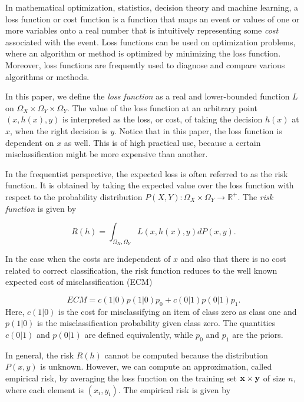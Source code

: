 In mathematical optimization, statistics, decision theory and machine learning, a loss function or cost function is a function that maps an event or values of one or more variables onto a real number that is intuitively representing some \emph{cost} associated with the event. Loss functions can be used on optimization problems, where an algorithm or method is optimized by minimizing the loss function.  Moreover, loss functions are frequently used to diagnose and compare various algorithms or methods.  

In this paper, we define the \emph{loss function} as a real and lower-bounded function $L$ on $\Omega_X \times \Omega_Y \times \Omega_Y$.  The value of the loss function at an arbitrary point $(x, h(x), y)$ is interpreted as the loss, or cost, of taking the decision $h(x)$ at $x$, when the right decision is $y$.  Notice that in this paper, the loss function is dependent on $x$ as well.  This is of high practical use, because a certain misclassification might be more expensive than another. 

In the frequentist perspective, the expected loss is often referred to as the risk function.  It is obtained by taking the expected value over the loss function with respect to the probability distribution $P(X,Y): \Omega_X\times \Omega_Y \rightarrow \mathbb{R}^+$.  The \emph{risk function} is given by

\begin{equation}
\label{def:risk}
R(h) = \int_{\Omega_X,\Omega_Y} L(x,h(x),y) dP(x,y).
\end{equation}

In the case when the costs are independent of $x$ and also that there is no cost related to correct classification, the risk function reduces to the well known expected cost of misclassification (ECM)

\begin{equation}
\label{eq:ecm}
ECM =  c(1|0)p(1|0)p_0  + c(0|1)p(0|1)p_1.
\end{equation}
Here, $c(1|0)$ is the cost for misclassifying an item of class zero as class one and $p(1|0)$ is the misclassification probability given class zero.  The quantities $c(0|1)$ and $p(0|1)$ are defined equivalently, while $p_0$ and $p_1$ are the priors.  

In general, the risk $R(h)$ cannot be computed because the distribution $P(x, y)$ is unknown.  However, we can compute an approximation, called empirical risk, by averaging the loss function on the training set $\mathbf{x} \times \mathbf{y}$ of size $n$, where each element is $(x_i, y_i)$.  The empirical risk is given by 

